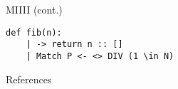 \documentclass[aspectratio=32]{beamer}
\begin{document}
  \begin{frame}[fragile]{\textbar{} MIIII (cont.)}
\begin{lstlisting}[title={The algorithm}]
def fib(n):
    | -> return n :: []
    | Match P <- <> DIV (1 \in N)
\end{lstlisting}
  \end{frame}


\begin{frame}
  \Large{References}
  \small\linespread{1.2}\printbibliography
\end{frame}
\end{document}
